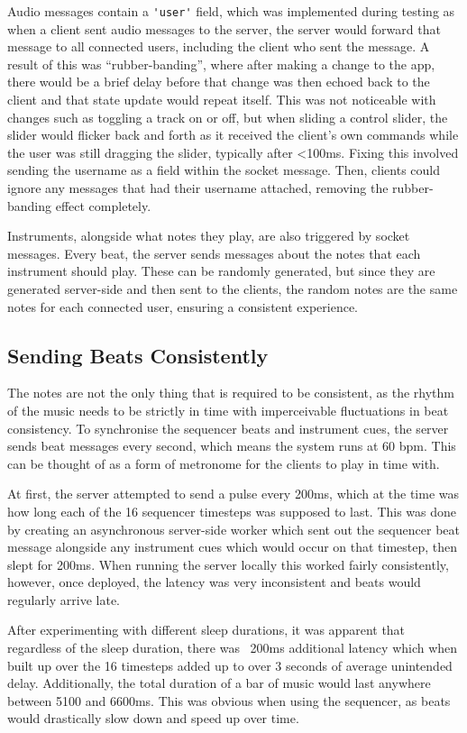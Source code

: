 Audio messages contain a \verb|'user'| field, which was implemented during testing as when a client sent audio messages to the server, the server would forward that message to all connected users, including the client who sent the message. A result of this was “rubber-banding”, where after making a change to the app, there would be a brief delay before that change was then echoed back to the client and that state update would repeat itself. This was not noticeable with changes such as toggling a track on or off, but when sliding a control slider, the slider would flicker back and forth as it received the client’s own commands while the user was still dragging the slider, typically after <100ms. Fixing this involved sending the username as a field within the socket message. Then, clients could ignore any messages that had their username attached, removing the rubber-banding effect completely.

Instruments, alongside what notes they play, are also triggered by socket messages. Every beat, the server sends messages about the notes that each instrument should play. These can be randomly generated, but since they are generated server-side and then sent to the clients, the random notes are the same notes for each connected user, ensuring a consistent experience.

\subsection{Sending Beats Consistently}
The notes are not the only thing that is required to be consistent, as the rhythm of the music needs to be strictly in time with imperceivable fluctuations in beat consistency. To synchronise the sequencer beats and instrument cues, the server sends beat messages every second, which means the system runs at 60 bpm. This can be thought of as a form of metronome for the clients to play in time with.

At first, the server attempted to send a pulse every 200ms, which at the time was how long each of the 16 sequencer timesteps was supposed to last. This was done by creating an asynchronous server-side worker which sent out the sequencer beat message alongside any instrument cues which would occur on that timestep, then slept for 200ms. When running the server locally this worked fairly consistently, however, once deployed, the latency was very inconsistent and beats would regularly arrive late.

After experimenting with different sleep durations, it was apparent that regardless of the sleep duration, there was ~200ms additional latency which when built up over the 16 timesteps added up to over 3 seconds of average unintended delay. Additionally, the total duration of a bar of music would last anywhere between 5100 and 6600ms. This was obvious when using the sequencer, as beats would drastically slow down and speed up over time.

